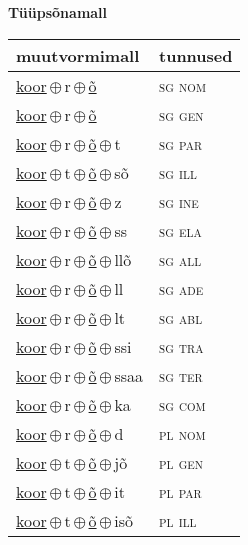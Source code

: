 

\vspace{3.5em}
\noindent \begin{minipage}{\textwidth}
\noindent \textbf{Tüüpsõnamall \,}\\

\begin{sideways}
\begin{tabular}{l l}
muutvormimall & tunnused \\
\hline
\underline{koor}\,$\oplus$\,r\,$\oplus$\,\underline{õ} & \textsc{ sg nom } \\
\underline{koor}\,$\oplus$\,r\,$\oplus$\,\underline{õ} & \textsc{ sg gen } \\
\underline{koor}\,$\oplus$\,r\,$\oplus$\,\underline{õ}\,$\oplus$\,t & \textsc{ sg par } \\
\underline{koor}\,$\oplus$\,t\,$\oplus$\,\underline{õ}\,$\oplus$\,sõ & \textsc{ sg ill } \\
\underline{koor}\,$\oplus$\,r\,$\oplus$\,\underline{õ}\,$\oplus$\,z & \textsc{ sg ine } \\
\underline{koor}\,$\oplus$\,r\,$\oplus$\,\underline{õ}\,$\oplus$\,ss & \textsc{ sg ela } \\
\underline{koor}\,$\oplus$\,r\,$\oplus$\,\underline{õ}\,$\oplus$\,llõ & \textsc{ sg all } \\
\underline{koor}\,$\oplus$\,r\,$\oplus$\,\underline{õ}\,$\oplus$\,ll & \textsc{ sg ade } \\
\underline{koor}\,$\oplus$\,r\,$\oplus$\,\underline{õ}\,$\oplus$\,lt & \textsc{ sg abl } \\
\underline{koor}\,$\oplus$\,r\,$\oplus$\,\underline{õ}\,$\oplus$\,ssi & \textsc{ sg tra } \\
\underline{koor}\,$\oplus$\,r\,$\oplus$\,\underline{õ}\,$\oplus$\,ssaa & \textsc{ sg ter } \\
\underline{koor}\,$\oplus$\,r\,$\oplus$\,\underline{õ}\,$\oplus$\,ka & \textsc{ sg com } \\
\underline{koor}\,$\oplus$\,r\,$\oplus$\,\underline{õ}\,$\oplus$\,d & \textsc{ pl nom } \\
\underline{koor}\,$\oplus$\,t\,$\oplus$\,\underline{õ}\,$\oplus$\,jõ & \textsc{ pl gen } \\
\underline{koor}\,$\oplus$\,t\,$\oplus$\,\underline{õ}\,$\oplus$\,it & \textsc{ pl par } \\
\underline{koor}\,$\oplus$\,t\,$\oplus$\,\underline{õ}\,$\oplus$\,isõ & \textsc{ pl ill } \\

\end{tabular}
\end{sideways}
\end{minipage}
